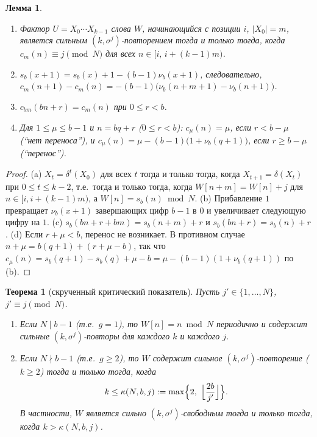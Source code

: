 \documentclass[a4paper,14pt]{extreport}
\theoremstyle{plain}
\newtheorem{theorem}{Теорема}[section]
\newtheorem{lemma}{Лемма}[section]
\theoremstyle{definition}
\theoremstyle{remark}
\begin{document}
\begin{lemma}\label{tw:lem}
	\begin{enumerate}
		\item[(a)] Фактор $U=X_0\cdots X_{k-1}$ слова $W$, начинающийся с позиции $i$, $|X_0|=m$, является сильным
		$(k,\sigma^j)$-повторением тогда и только тогда, когда $c_m(n)\equiv j \pmod N$ для всех $n\in[i,\,i+(k-1)m)$.
		\item[(b)] $s_b(x+1)=s_b(x)+1-(b-1)\nu_b(x+1)$, следовательно,
		$c_m(n+1)-c_m(n)=-(b-1)\bigl(\nu_b(n+m+1)-\nu_b(n+1)\bigr)$.
		\item[(c)] $c_{bm}(bn+r)=c_m(n)$ при $0\le r<b$.
		\item[(d)] Для $1\le\mu\le b-1$ и $n=bq+r$ ($0\le r<b$):
		$c_\mu(n)=\mu$, если $r<b-\mu$ (``нет переноса''), и
		$c_\mu(n)=\mu-(b-1)\bigl(1+\nu_b(q+1)\bigr)$, если $r\ge b-\mu$ (``перенос'').
	\end{enumerate}
\end{lemma}
\begin{proof}
	(a) $X_t=\delta^t(X_0)$ для всех $t$ тогда и только тогда, когда $X_{t+1}=\delta(X_t)$ при $0\le t\le k-2$, т.е.\ тогда и только тогда, когда
	$W[n+m]=W[n]+j$ для $n\in[i,i+(k-1)m)$, а $W[n]=s_b(n)\bmod N$.
	(b) Прибавление $1$ превращает $\nu_b(x+1)$ завершающих цифр $b-1$ в $0$ и увеличивает следующую цифру на $1$.
	(c) $s_b(bn+r+bm)=s_b(n+m)+r$ и $s_b(bn+r)=s_b(n)+r$.
	(d) Если $r+\mu<b$, перенос не возникает. В противном случае $n+\mu=b(q+1)+(r+\mu-b)$, так что
	$c_\mu(n)=s_b(q+1)-s_b(q)+\mu-b=\mu-(b-1)(1+\nu_b(q+1))$ по (b).
\end{proof}

\begin{theorem}[скрученный критический показатель]\label{tw:main}
	Пусть $j'\in\{1,\dots,N\}$, $j'\equiv j\pmod N$.
	\begin{enumerate}
		\item[(i)] Если $N\mid b-1$ (т.е.\ $g=1$), то $W[n]=n\bmod N$ периодично и содержит сильные
		$(k,\sigma^j)$-повторы для каждого $k$ и каждого $j$.
		\item[(ii)] Если $N\nmid b-1$ (т.е.\ $g\ge2$), то $W$ содержит сильное $(k,\sigma^j)$-повторение ($k\ge2$)
		тогда и только тогда, когда
		\begin{equation}
			k\le\kappa(N,b,j):=\max\Bigl\{2,\ \Bigl\lfloor\frac{2b}{j'}\Bigr\rfloor\Bigr\}.
		\end{equation}
		В частности, $W$ является сильно $(k,\sigma^j)$-свободным тогда и только тогда, когда $k>\kappa(N,b,j)$.
	\end{enumerate}
\end{theorem}
\end{document}
